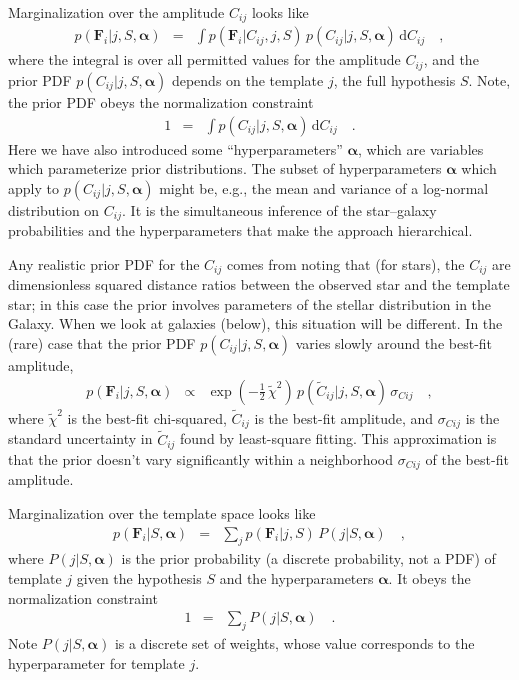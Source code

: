 \documentclass[12pt,preprint]{aastex}
\newcommand{\datavector}[1]{\boldsymbol{#1}}
\newcommand{\flux}{\datavector{F}}
\newcommand{\hyperpars}{\datavector{\alpha}}
\newcommand{\dd}{\mathrm{d}}
\begin{document}
Marginalization over the amplitude $C_{ij}$ looks like
\begin{eqnarray}\displaystyle
p(\flux_i|j,S,\hyperpars) & = & \int p(\flux_i|C_{ij},j,S)\,p(C_{ij}|j,S,\hyperpars)\,\dd C_{ij}
\quad ,
\end{eqnarray}
where the integral is over all permitted values for the amplitude
$C_{ij}$, and the prior PDF $p(C_{ij}|j,S,\hyperpars)$ depends on the
template $j$, the full hypothesis $S$.  Note, the prior PDF obeys the normalization
constraint
\begin{eqnarray}\displaystyle
1 & = & \int p(C_{ij}|j,S,\hyperpars)\,\dd C_{ij}
\quad .
\end{eqnarray}
\noindent Here we have also introduced some 
``hyperparameters'' $\hyperpars$, which are variables which parameterize 
prior distributions.  The subset of hyperparameters $\hyperpars$ which 
apply to $p(C_{ij}|j,S,\hyperpars)$ might be, e.g., the mean and variance of 
a log-normal distribution on $C_{ij}$.   It is the simultaneous inference
of the star--galaxy probabilities and the hyperparameters that
make the approach hierarchical.  

Any realistic prior PDF for the $C_{ij}$ comes from noting that (for
stars), the $C_{ij}$ are dimensionless squared distance ratios between
the observed star and the template star; in this case the prior
involves parameters of the stellar distribution in the Galaxy.  When
we look at galaxies (below), this situation will be different.  In the
(rare) case that the prior PDF $p(C_{ij}|j,S,\hyperpars)$ varies
slowly around the best-fit amplitude,
\begin{eqnarray}\displaystyle
p(\flux_i|j,S,\hyperpars) & \propto & \exp(-\frac{1}{2}\,\tilde{\chi}^2)
  \,p(\tilde{C}_{ij}|j,S,\hyperpars)\,\sigma_{Cij}
\quad ,
\end{eqnarray}
where $\tilde{\chi}^2$ is the best-fit chi-squared, $\tilde{C}_{ij}$
is the best-fit amplitude, and $\sigma_{Cij}$ is the standard
uncertainty in $\tilde{C}_{ij}$ found by least-square fitting.  This
approximation is that the prior doesn't vary significantly
within a neighborhood $\sigma_{Cij}$ of the best-fit amplitude.  

Marginalization over the template space looks like
\begin{eqnarray}\displaystyle
p(\flux_i|S,\hyperpars) & = & \sum_j p(\flux_i|j,S)\,P(j|S,\hyperpars)
\quad ,
\end{eqnarray}
where $P(j|S,\hyperpars)$ is the prior probability (a discrete
probability, not a PDF) of template $j$ given the hypothesis $S$ and
the hyperparameters $\hyperpars$.  It obeys the normalization
constraint
\begin{eqnarray}\displaystyle
1 & = & \sum_j P(j|S,\hyperpars)
\quad .
\end{eqnarray}
\noindent Note $P(j|S,\hyperpars)$ is a discrete set of weights, 
whose value corresponds to the hyperparameter for template $j$.
\end{document}
